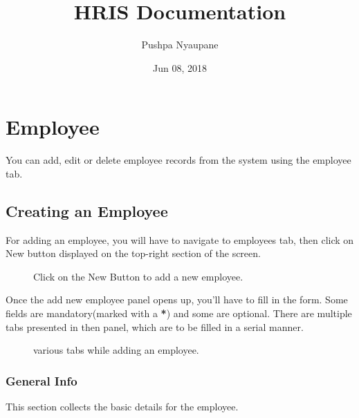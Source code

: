 \documentclass[letterpaper,10pt,english]{sphinxmanual}
\title{HRIS Documentation}
\date{Jun 08, 2018}
\author{Pushpa Nyaupane}
\begin{document}
\maketitle
\sphinxtableofcontents
{}\label{\detokenize{HRIS::doc}}



\chapter{Employee}
\label{\detokenize{employee/employee:employee}}\label{\detokenize{employee/employee:hris-documentation}}\label{\detokenize{employee/employee::doc}}
You can add, edit or delete employee records from the system using the employee tab.


\section{Creating an Employee}
\label{\detokenize{employee/add:creating-an-employee}}\label{\detokenize{employee/add::doc}}\label{\detokenize{employee/add:add-employee}}
For adding an employee, you will have to navigate to employees tab, then click on New button displayed on the top-right section of the screen.

\begin{figure}[htbp]
\centering
\capstart

\noindent{}
\caption{Click on the New Button to add a new employee.}\label{\detokenize{employee/add:id3}}\end{figure}

Once the add new employee panel opens up, you’ll have to fill in the form. Some fields are mandatory(marked with a {\color{red}\bfseries{}*}) and some are optional. There are multiple tabs presented in then panel, which are to be filled in a serial manner.

\begin{figure}[htbp]
\centering
\capstart

\noindent{}
\caption{various tabs while adding an employee.}\label{\detokenize{employee/add:id4}}\end{figure}


\subsection{General Info}
\label{\detokenize{employee/add:general-info}}
This section collects the basic details for the employee.
\end{document}

